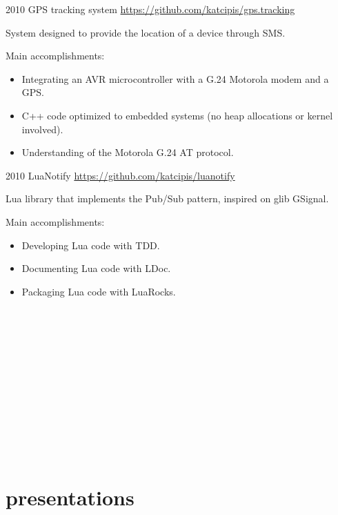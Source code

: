 \documentclass[]{friggeri-cv} %
\begin{document}
\begin{entrylist}
\entry
{2010}
{GPS tracking system}
{\href{https://github.com/katcipis/gps.tracking}{https://github.com/katcipis/gps.tracking}}
{

System designed to provide the location of a device through SMS. 

Main accomplishments:\\
\begin{itemize}
\item Integrating an AVR microcontroller with a G.24 Motorola modem and a GPS.
\item C++ code optimized to embedded systems (no heap allocations or kernel involved).
\item Understanding of the Motorola G.24 AT protocol.
\end{itemize}
}
\end{entrylist}

\begin{entrylist}
\entry
{2010}
{LuaNotify}
{\href{https://github.com/katcipis/luanotify}{https://github.com/katcipis/luanotify}}
{

Lua library that implements the Pub/Sub pattern, inspired on glib GSignal.

Main accomplishments:\\
\begin{itemize}
\item Developing Lua code with TDD.
\item Documenting Lua code with LDoc.
\item Packaging Lua code with LuaRocks.
\end{itemize}
}
\end{entrylist}
\\
\\
\\
\\
\\
\\
\\
\\
\\
\\
\\

\section{presentations}
\end{document}
